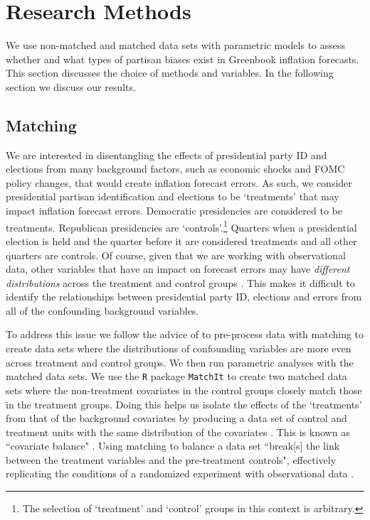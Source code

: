 \documentclass[a4paper]{article}\usepackage{graphicx, color}
\begin{document}

\section{Research Methods}

We use non-matched and matched data sets with parametric models \citep[see][]{Ho2007} to assess whether and what types of partisan biases exist in Greenbook inflation forecasts. This section discusses the choice of methods and variables. In the following section we discuss our results.

\subsection{Matching}

We are interested in disentangling the effects of presidential party ID and elections from many background factors, such as economic shocks and FOMC policy changes, that would create inflation forecast errors. As such, we consider presidential partisan identification and elections to be `treatments' that may impact inflation forecast errors. Democratic presidencies are considered to be treatments. Republican presidencies are `controls'.\footnote{The selection of `treatment' and `control' groups in this context is arbitrary.} Quarters when a presidential election is held and the quarter before it are considered treatments and all other quarters are controls. Of course, given that we are working with observational data, other variables that have an impact on forecast errors may have {\emph{different distributions}} across the treatment and control groups \citep{Cochran1973, Diamond2012}. This makes it difficult to identify the relationships between presidential party ID, elections and errors from all of the confounding background variables.

To address this issue we follow the advice of \cite{Ho2007} to pre-process data with matching to create data sets where the distributions of confounding variables are more even across treatment and control groups. We then run parametric analyses with the matched data sets. We use the {\tt{R}} package {\tt{MatchIt}} \citep{matchit2011} to create two matched data sets where the non-treatment covariates in the control groups closely match those in the treatment groups. Doing this helps us isolate the effects of the `treatments' from that of the background covariates by producing a data set of control and treatment units with the same distribution of the covariates \citep{matchit2011}. This is known as ``covariate balance" \cite[1]{Diamond2012}. Using matching to balance a data set ``break[s] the link between the treatment variables and the pre-treatment controls", effectively replicating the conditions of a randomized experiment with observational data \cite[][2--3]{matchit2011}. 
\end{document}
